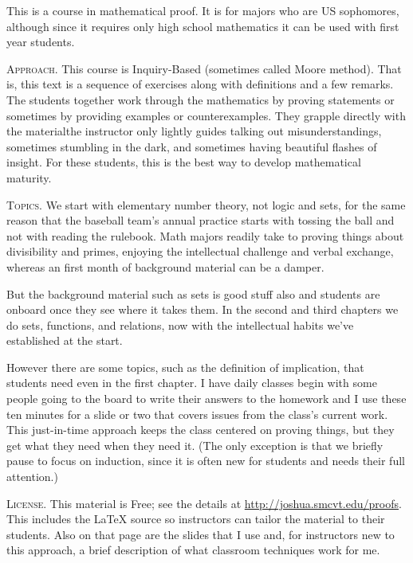 \documentclass{ibl}
\begin{document}
This is a course in mathematical proof. 
It is for majors who are US sophomores, although since
it requires only high school mathematics
it can be used with first year students.



\medskip
\noindent\textsc{Approach.}
This course is Inquiry-Based (sometimes called Moore method).
That is, this text is a sequence of exercises
along with definitions and a few 
remarks.
The students together work through the mathematics by
proving statements or sometimes by providing examples or counterexamples.
They grapple directly with the material\Dash the instructor only 
lightly guides\Dash
talking out misunderstandings, 
sometimes stumbling in the dark, and sometimes
having beautiful flashes of insight.
For these students, 
this is the best way to develop mathematical maturity.


\medskip
\noindent\textsc{Topics.}
We start with elementary number theory, not logic and sets, 
for the same reason
that the baseball team's annual practice starts with tossing the ball and 
not with reading the rulebook.
Math majors readily take to proving things about
divisibility and primes, enjoying the 
intellectual challenge and verbal exchange, 
whereas an first month of background material can be a damper.

But the background material such as sets is good stuff also and 
students are onboard once they see where it takes them.
In the second and third chapters we do
sets, functions, and relations, now with the
intellectual habits we've established at the start.

However there are some topics, such as the definition of implication, 
that students need even in the
first chapter.
I have daily classes begin with some people going to the 
board to write their answers to the homework and 
I use these ten minutes for a slide or two that covers issues from
the class's current work.
This just-in-time approach keeps the class centered 
on proving things, but they get what
they need when they need it.
(The only exception is that we briefly pause to focus on induction,
since it is often new for students and needs 
their full attention.)



\medskip
\noindent\textsc{License.}
This material is Free; see the details  
at \url{http://joshua.smcvt.edu/proofs}.
This includes the \LaTeX{} source so instructors can tailor the
material to their students.  
Also on that page are the slides that I use
and, for instructors new to this approach, 
a brief description of what classroom techniques work for me.
\end{document}
